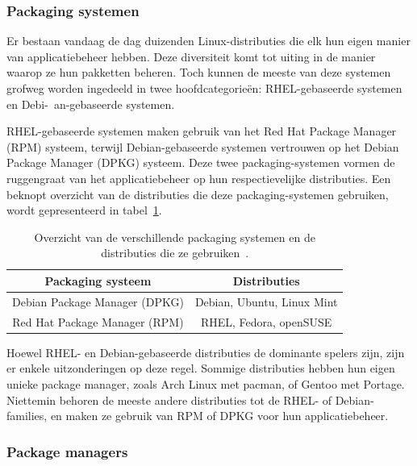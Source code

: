 \subsubsection{Packaging systemen}
\label{linux_packaging_systemen}

Er bestaan vandaag de dag duizenden Linux-distributies die elk hun eigen manier van applicatiebeheer hebben.
Deze diversiteit komt tot uiting in de manier waarop ze hun pakketten beheren.
Toch kunnen de meeste van deze systemen grofweg worden ingedeeld in twee hoofdcategorie\"en: RHEL-gebaseerde systemen en Debi-\ an-gebaseerde systemen.

RHEL-gebaseerde systemen maken gebruik van het Red Hat Package Manager (RPM) systeem, terwijl Debian-gebaseerde systemen vertrouwen op het Debian Package Manager (DPKG) systeem.
Deze twee packaging-systemen vormen de ruggengraat van het applicatiebeheer op hun respectievelijke distributies.
Een beknopt overzicht van de distributies die deze packaging-systemen gebruiken, wordt gepresenteerd in tabel~\ref{table:packaging-systems}.

\begin{table}[!h]
    \begin{center}
        \begin{tabular}{ c c  }
            \hline
                Packaging systeem & Distributies\\ [0.5ex] 
            \hline
            Debian Package Manager (DPKG)     & Debian, Ubuntu, Linux Mint \\
            Red Hat Package Manager (RPM)     & RHEL, Fedora, openSUSE \\
        \end{tabular}
    \end{center}
    \caption{Overzicht van de verschillende packaging systemen en de distributies die ze gebruiken~\autocite{shotts2019linux}.}
    \label{table:packaging-systems}
\end{table}

Hoewel RHEL- en Debian-gebaseerde distributies de dominante spelers zijn, zijn er enkele uitzonderingen op deze regel.
Sommige distributies hebben hun eigen unieke package manager, zoals Arch Linux met pacman, of Gentoo met Portage.
Niettemin behoren de meeste andere distributies tot de RHEL- of Debian-families, en maken ze gebruik van RPM of DPKG voor hun applicatiebeheer.

\subsubsection{Package managers}
\label{linux_package_managers}

